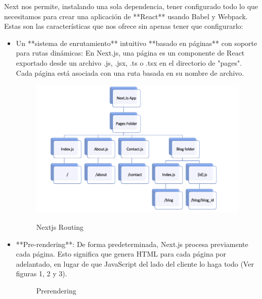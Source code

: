 \documentclass[12pt,twoside,titlepage]{report}
\begin{document}
Next nos permite, instalando una sola dependencia, tener configurado todo lo que necesitamos para crear una aplicación de **React** usando Babel y Webpack.  Estas son las características que nos ofrece sin apenas tener que configurarlo:

\begin{itemize}
    \item Un **sistema de enrutamiento** intuitivo **basado en páginas** con soporte para rutas dinámicas: En Next.js, una página es un componente de React exportado desde un archivo .js, .jsx, .ts o .tsx en el directorio de "pages". Cada página está asociada con una ruta basada en su nombre de archivo.
    \begin{figure}[H]
        \centering
        \includegraphics[scale=0.4]{Nextjs/Routing}
        \label{fig:nextjs_routing}
        \caption{Nextjs Routing}
    \end{figure}
    
    \item **Pre-rendering**: De forma predeterminada, Next.js procesa previamente cada página. Esto significa que genera HTML para cada página por adelantado, en lugar de que JavaScript del lado del cliente lo haga todo (Ver figuras 1, 2 y 3). 
    \begin{figure}[H]
        \centering
        \caption{Prerendering}
        \label{f:Prerendering}
       \end{figure}


\end{itemize}
\end{document}
